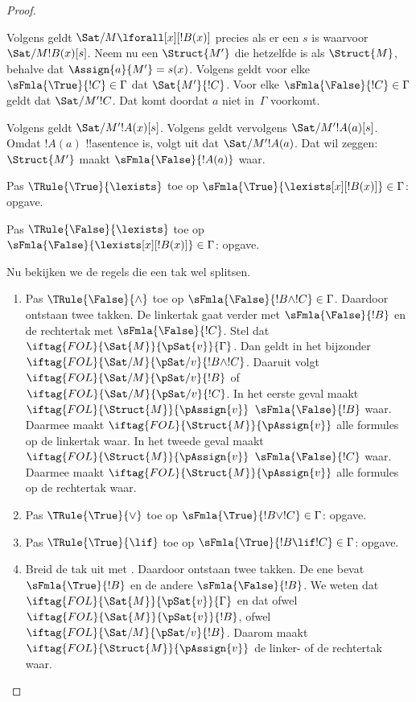 \documentclass[openany]{memoir}
\begin{document}
\begin{proof}
\begin{enumerate}
{  Volgens  geldt
  $\Sat/{M}{\lforall[x][!B(x)]}$ precies als er een $s$ is waarvoor
  $\Sat/{M}{!B(x)}[s]$. Neem nu een $\Struct{M'}$ die hetzelfde is als
  $\Struct{M}$, behalve dat $\Assign{a}{M'} = s(x)$. Volgens
   geldt voor elke
  $\sFmla{\True}{!C} \in \Gamma$ dat $\Sat{M'}{!C}$. Voor elke
  $\sFmla{\False}{!C} \in \Gamma$ geldt dat $\Sat/{M'}{!C}$. Dat komt
  doordat $a$ niet in~$\Gamma$ voorkomt.

  Volgens  geldt
  $\Sat/{M'}{!A(x)}[s]$. Volgens
   geldt vervolgens
  $\Sat/{M'}{!A(a)}[s]$. Omdat $!A(a)$ !!a{sentence} is, volgt uit
   dat
  $\Sat/{M'}{!A(a)}$. Dat wil zeggen: $\Struct{M'}$ maakt
  $\sFmla{\False}{!A(a)}$ waar.
\item Pas $\TRule{\True}{\lexists}$ toe op
  $\sFmla{\True}{\lexists[x][!B(x)]} \in \Gamma$: opgave.
\item Pas $\TRule{\False}{\lexists}$ toe op
  $\sFmla{\False}{\lexists[x][!B(x)]} \in \Gamma$: opgave.}{}
\end{enumerate}
Nu bekijken we de regels die een tak wel splitsen.
\begin{enumerate}
\item Pas $\TRule{\False}{\land}$ toe op
  $\sFmla{\False}{!B \land !C} \in \Gamma$. Daardoor ontstaan twee
  takken. De linkertak gaat verder met $\sFmla{\False}{!B}$ en de
  rechtertak met $\sFmla{\False}{!C}$. Stel dat
  $\iftag{FOL}{\Sat{M}}{\pSat{v}}{\Gamma}$. Dan geldt in het bijzonder
  $\iftag{FOL}{\Sat/{M}}{\pSat/{v}}{!B \land !C}$. Daaruit volgt
  $\iftag{FOL}{\Sat/{M}}{\pSat/{v}}{!B}$ of
  $\iftag{FOL}{\Sat/{M}}{\pSat/{v}}{!C}$. In het eerste geval maakt
  $\iftag{FOL}{\Struct{M}}{\pAssign{v}}$
  $\sFmla{\False}{!B}$ waar. Daarmee maakt
  $\iftag{FOL}{\Struct{M}}{\pAssign{v}}$ alle formules op de linkertak
  waar. In het tweede geval maakt
  $\iftag{FOL}{\Struct{M}}{\pAssign{v}}$
  $\sFmla{\False}{!C}$ waar. Daarmee maakt
  $\iftag{FOL}{\Struct{M}}{\pAssign{v}}$ alle formules op de
  rechtertak waar.
\item Pas $\TRule{\True}{\lor}$ toe op
  $\sFmla{\True}{!B \lor !C} \in \Gamma$: opgave.
\item Pas $\TRule{\True}{\lif}$ toe op
  $\sFmla{\True}{!B \lif !C} \in \Gamma$: opgave.
\item Breid de tak uit met \Cut. Daardoor ontstaan twee takken. De ene
  bevat $\sFmla{\True}{!B}$ en de andere
  $\sFmla{\False}{!B}$. We weten dat
  $\iftag{FOL}{\Sat{M}}{\pSat{v}}{\Gamma}$ en dat ofwel
  $\iftag{FOL}{\Sat{M}}{\pSat{v}}{!B}$, ofwel
  $\iftag{FOL}{\Sat/{M}}{\pSat/{v}}{!B}$. Daarom maakt
  $\iftag{FOL}{\Struct{M}}{\pAssign{v}}$ de linker- of de rechtertak
  waar.
\end{enumerate}
\end{proof}
\end{document}
